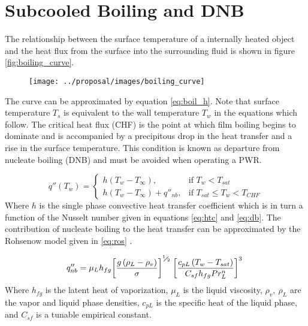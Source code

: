 \section{Subcooled Boiling and DNB}

The relationship between the surface temperature of a internally heated object and the heat flux from the surface into the surrounding fluid is shown in figure \ref{fig:boiling_curve}.

\begin{figure}[H]
    \centering
    \texttt{[image: ../proposal/images/boiling\_curve]}
    \caption{}
    \label{fig:boilingcurve}
\end{figure}


The curve can be approximated by equation \ref{eq:boil_h}.  Note that surface temperature $T_s$ is equivalent to the wall temperature $T_w$ in the equations which follow.
The critical heat flux (CHF) is the point at which film boiling begins to dominate and is accompanied by a precipitous drop in the heat transfer and a rise in the surface temperature.  This condition is known as departure from nucleate boiling (DNB) and must be avoided when operating a PWR.

\begin{equation}
q''(T_w) = 
\begin{cases}
      h(T_w-T_{\infty}), & \mbox{if } T_w < T_{sat} \\
      h(T_w-T_{\infty}) + q''_{nb} ,  & \mbox{if } T_{sat} \leq T_w < T_{CHF} 
\end{cases}
\label{eq:boil_h}
\end{equation}
Where $h$ is the single phase convective heat transfer coefficient which is in turn a function of the Nusselt number given in equations \ref{eq:htc} and \ref{eq:db}.  The contribution of nucleate boiling to the heat transfer can be approximated by the Rohsenow model given in \ref{eq:ros} \cite{rohsenow51}.

\begin{equation}
q''_{nb} = {{\mu }_{L}}{{h}_{fg}}{{\left[ \frac{g\left( {{\rho }_{L}}-{{\rho }_{v}} \right)}{\sigma } \right]}^{{}^{1}\!\!\diagup\!\!{}_{2}\;}}{{\left[ \frac{{{c}_{pL}}\left( {{T}_{w}}-{{T}_{sat}} \right)}{{{C}_{sf}}{{h}_{fg}}Pr_{L}^{n}} \right]}^{3}\;}
\label{eq:ros}
\end{equation}
Where $h_{fg}$ is the latent heat of vaporization, $\mu_L$ is the liquid viscosity, $\rho_v,\ \rho_L$ are the vapor and liquid phase densities, ${c}_{pL}$ is the specific heat of the liquid phase, and ${C}_{sf}$ is a tunable empirical constant.


